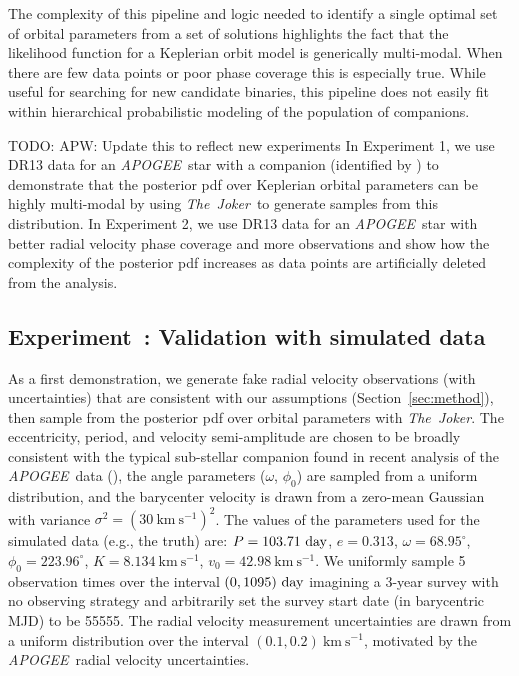\documentclass[manuscript, letterpaper]{aastex6}
\newcommand{\project}[1]{\textsl{#1}}
\newcommand{\acronym}[1]{{\small{#1}}}
\newcommand{\apogee}{\project{\acronym{APOGEE}}}
\newcommand{\samplername}{\project{The~Joker}}
\newcommand{\sectionname}{Section}
\newcommand{\kms}{\mathrm{km}~\mathrm{s}^{-1}}
\newcounter{expcounter}
\newcommand{\todo}[1]{{\color{red}TODO: #1}}
\begin{document}
The complexity of this pipeline and logic needed to identify a single optimal
set of orbital parameters from a set of solutions highlights the fact that the
likelihood function for a Keplerian orbit model is generically multi-modal.
When there are few data points or poor phase coverage this is especially true.
While useful for searching for new candidate binaries, this pipeline does not
easily fit within hierarchical probabilistic modeling of the population of
companions.

\todo{APW: Update this to reflect new experiments}
In Experiment 1, we use DR13 data for an \apogee\ star with a companion
(identified by \citealt{Troup:2016}) to demonstrate that the posterior pdf over
Keplerian orbital parameters can be highly multi-modal by using \samplername\
to generate samples from this distribution.
In Experiment 2, we use DR13 data for an \apogee\ star with better radial
velocity phase coverage and more observations and show how the complexity of
the posterior pdf increases as data points are artificially deleted from the
analysis.

\subsection{Experiment~: Validation with simulated data}
\stepcounter{expcounter}

As a first demonstration, we generate fake radial velocity observations (with
uncertainties) that are consistent with our assumptions
(\sectionname~\ref{sec:method}), then sample from the posterior pdf over orbital
parameters with \samplername.
The eccentricity, period, and velocity semi-amplitude are chosen to be broadly
consistent with the typical sub-stellar companion found in recent analysis of
the \apogee\ data (\citealt{Troup:2016}), the angle parameters ($\omega$,
$\phi_0$) are sampled from a uniform distribution, and the barycenter velocity
is drawn from a zero-mean Gaussian with variance $\sigma^2 = (30~\kms)^2$.
The values of the parameters used for the simulated data (e.g., the truth) are:
$P = 103.71~{\rm day}$, $e = 0.313$, $\omega = 68.95^\circ$,
$\phi_0 = 223.96^\circ$, $K = 8.134~\kms$, $v_0 = 42.98~\kms$.
We uniformly sample 5 observation times over the interval $(0,1095)~{\rm day}$
imagining a 3-year survey with no observing strategy and arbitrarily set the
survey start date (in barycentric MJD) to be 55555.
The radial velocity measurement uncertainties are drawn from a uniform
distribution over the interval $(0.1, 0.2)~\kms$, motivated by the \apogee\
radial velocity uncertainties.
\end{document}
